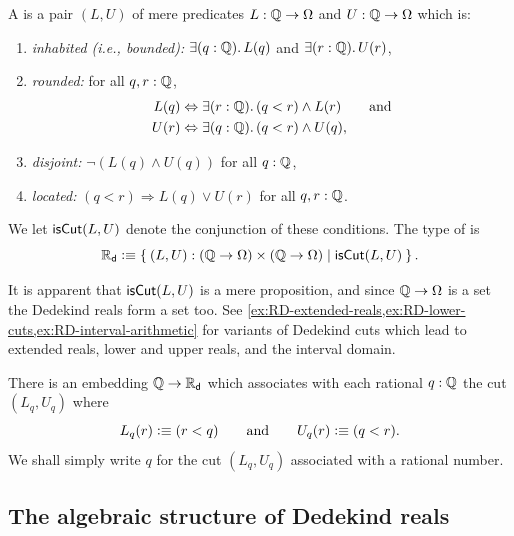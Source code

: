 \begin{defn} \label{defn:dedekind-reals}
  A 
  is a pair $(L, U)$ of mere predicates $L : \mathbb{Q} \to \Omega$ and $U
  : \mathbb{Q} \to \Omega$ which is:
  \begin{enumerate}
  \item \label{defn:dedekind-reals-inhabited}
    \emph{inhabited (i.e., bounded):} $\exis{q : \Q} L(q)$ and $\exis{r : \Q} U(r)$,
  \item \emph{rounded:} for all $q, r : \mathbb{Q}$,
    \begin{align*}
      L(q) &\Leftrightarrow \exis{r : \Q} (q < r) \land L(r)
      \qquad\text{and}\\
      U(r) &\Leftrightarrow \exis{q : \Q} (q < r) \land U(q),
    \end{align*}
  \item \emph{disjoint:} $\lnot (L(q) \land U(q))$ for all $q : \mathbb{Q}$,
  \item \emph{located:} $(q < r) \Rightarrow L(q) \lor U(r)$ for all $q, r : \mathbb{Q}$.
  \end{enumerate}
  We let $\mathsf{isCut}(L, U)$ denote the conjunction of these conditions. The type of
   is
  \begin{equation*}
    \RD \defeq \setof{ (L, U) : (\Q \to \Omega) \times (\Q \to \Omega) | \dcut(L,U)}.
  \end{equation*}
\end{defn}

It is apparent that $\mathsf{isCut}(L, U)$ is a mere proposition, and since $\mathbb{Q} \to \Omega$ is a
set the Dedekind reals form a set too. See
\cref{ex:RD-extended-reals,ex:RD-lower-cuts,ex:RD-interval-arithmetic} for variants of
Dedekind cuts which lead to extended reals, lower and upper reals, and the interval
domain.

There is an embedding $\mathbb{Q} \to \mathbb{R}_\mathsf{d}$ which associates with each rational $q : \mathbb{Q}$ the cut
$(L_q, U_q)$ where
%
\begin{equation*}
  L_q(r) \vcentcolon\equiv (r < q)
  \qquad\text{and}\qquad
  U_q(r) \vcentcolon\equiv (q < r).
\end{equation*}
%
We shall simply write $q$ for the cut $(L_q, U_q)$ associated with a rational number.

\subsection{The algebraic structure of Dedekind reals}
\label{sec:algebr-struct-dedek}


